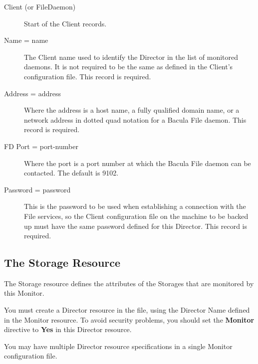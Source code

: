 \begin{description}

\item [Client (or FileDaemon)]
   Start of the Client records.  

\item [Name = \lt{}name\gt{}]
   The Client name used to identify  the Director in the list of monitored
daemons. It is not required  to be the same as defined in the Client's
configuration file.  This record is required.  

\item [Address = \lt{}address\gt{}]
   Where the address is a host  name, a fully qualified domain name, or a network
address in  dotted quad notation for a Bacula File daemon.  This record is
required. 

\item [FD Port = \lt{}port-number\gt{}]
   Where the port is a port  number at which the Bacula File daemon can be
contacted.  The default is 9102. 

\item [Password = \lt{}password\gt{}]
   This is the password to be  used when establishing a connection with the File
services, so  the Client configuration file on the machine to be backed up
must  have the same password defined for this Director. This record is 
required. 
\end{description}

\subsection*{The Storage Resource}
\label{StorageResource1}

The Storage resource defines the attributes of the Storages that are monitored
by this Monitor.

You must create a Director resource in the 
 file, using the
Director Name defined in the Monitor resource. To avoid security problems, you
should set the {\bf Monitor} directive to {\bf Yes} in this Director resource.


You may have multiple Director resource specifications in a single Monitor
configuration file. 

